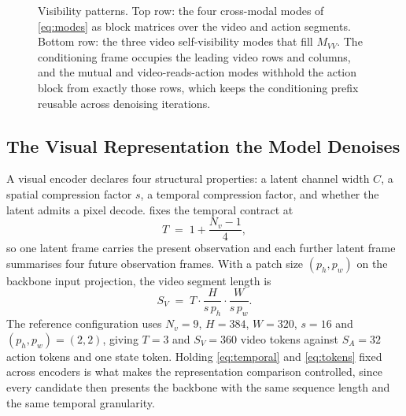 \begin{figure}[t]
{}
\caption{Visibility patterns. Top row: the four cross-modal modes of
\eqref{eq:modes} as block matrices over the video and action segments. Bottom
row: the three video self-visibility modes that fill $M_{VV}$. The conditioning
frame occupies the leading video rows and columns, and the mutual and
video-reads-action modes withhold the action block from exactly those rows, which
keeps the conditioning prefix reusable across denoising iterations.}
\label{fig:masks}
\end{figure}

\subsection{The Visual Representation the Model Denoises}
\label{sec:repr}

A visual encoder declares four structural properties: a latent channel width $C$,
a spatial compression factor $s$, a temporal compression factor, and whether the
latent admits a pixel decode. \sys{} fixes the temporal contract at
\begin{equation}
  T \;=\; 1 + \frac{N_v - 1}{4},
  \label{eq:temporal}
\end{equation}
so one latent frame carries the present observation and each further latent frame
summarises four future observation frames. With a patch size $(p_h, p_w)$ on the
backbone input projection, the video segment length is
\begin{equation}
  S_V \;=\; T \cdot \frac{H}{s\,p_h} \cdot \frac{W}{s\,p_w}.
  \label{eq:tokens}
\end{equation}
The reference configuration uses $N_v = 9$, $H = 384$, $W = 320$, $s = 16$ and
$(p_h, p_w) = (2,2)$, giving $T = 3$ and $S_V = 360$ video tokens against
$S_A = 32$ action tokens and one state token. Holding \eqref{eq:temporal} and
\eqref{eq:tokens} fixed across encoders is what makes the representation
comparison controlled, since every candidate then presents the backbone with the
same sequence length and the same temporal granularity.

